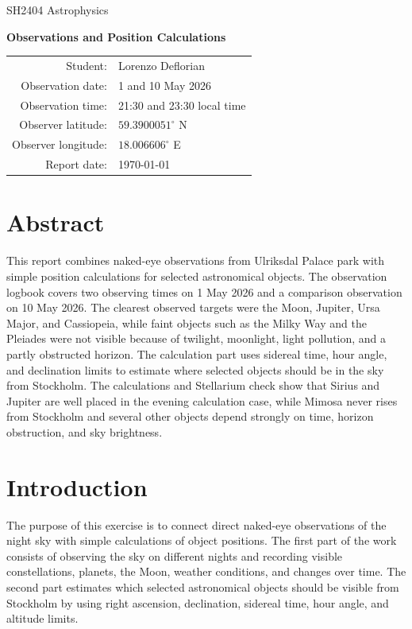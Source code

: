 \documentclass[a4paper,11pt]{article}
\newcommand{\coursename}{SH2404 Astrophysics}
\newcommand{\reporttitle}{Observations and Position Calculations}
\newcommand{\studentname}{Lorenzo Deflorian}
\newcommand{\observationdate}{1 and 10 May 2026}
\newcommand{\observationtime}{21:30 and 23:30 local time}
\newcommand{\observerlatitude}{$59.3900051^\circ$ N}
\newcommand{\observerlongitude}{$18.006606^\circ$ E}
\begin{document}

\begin{titlepage}
    \centering
    \vspace*{2cm}

    {\Large \coursename\par}
    \vspace{1.5cm}

    {\huge\bfseries \reporttitle\par}
    \vspace{2cm}

    \begin{tabular}{rl}
        Student: & \studentname \\
        Observation date: & \observationdate \\
        Observation time: & \observationtime \\
        Observer latitude: & \observerlatitude \\
        Observer longitude: & \observerlongitude \\
        Report date: & \today \\
    \end{tabular}

    \vfill
\end{titlepage}

\tableofcontents
\clearpage

\section{Abstract}
This report combines naked-eye observations from Ulriksdal Palace park with simple position calculations for selected astronomical objects. The observation logbook covers two observing times on 1 May 2026 and a comparison observation on 10 May 2026. The clearest observed targets were the Moon, Jupiter, Ursa Major, and Cassiopeia, while faint objects such as the Milky Way and the Pleiades were not visible because of twilight, moonlight, light pollution, and a partly obstructed horizon. The calculation part uses sidereal time, hour angle, and declination limits to estimate where selected objects should be in the sky from Stockholm. The calculations and Stellarium check show that Sirius and Jupiter are well placed in the evening calculation case, while Mimosa never rises from Stockholm and several other objects depend strongly on time, horizon obstruction, and sky brightness.

\section{Introduction}
The purpose of this exercise is to connect direct naked-eye observations of the night sky with simple calculations of object positions. The first part of the work consists of observing the sky on different nights and recording visible constellations, planets, the Moon, weather conditions, and changes over time. The second part estimates which selected astronomical objects should be visible from Stockholm by using right ascension, declination, sidereal time, hour angle, and altitude limits.
\end{document}
